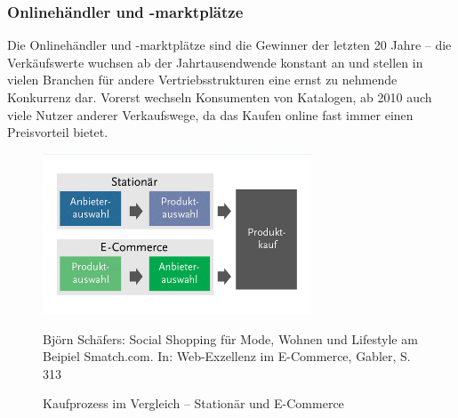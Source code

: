 \begin{folding}

\end{folding}

\begin{folding} \subsubsection{Onlinehändler und -marktplätze}

Die Onlinehändler und -marktplätze sind die Gewinner der letzten 20 Jahre – die Verkäufswerte wuchsen ab der Jahrtausendwende konstant an und stellen in vielen Branchen für andere Vertriebsstrukturen eine ernst zu nehmende Konkurrenz dar\cite{wolf}. Vorerst wechseln Konsumenten von Katalogen, ab 2010 auch viele Nutzer anderer Verkaufswege, da das Kaufen online fast immer einen Preisvorteil bietet\cite[S. 31]{Graf}.
\begin{figure}[h]
    \begin{center}
        \includegraphics[width=8cm]{media/Fabian-konsumwandel.png}
        \caption{Kaufprozess im Vergleich – Stationär und E-Commerce}
        \label{konsumwandel}
        \bildquelle Björn Schäfers: Social Shopping für Mode, Wohnen und Lifestyle am Beipiel Smatch.com. In: Web-Exzellenz im E-Commerce, Gabler, S. 313 %
    \end{center}
\end{figure} 

\end{folding}
